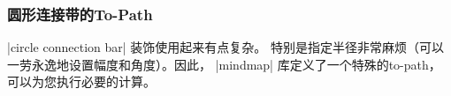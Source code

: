 \subsubsection{圆形连接带的To-Path}


|circle connection bar| 装饰使用起来有点复杂。 特别是指定半径非常麻烦（可以一劳永逸地设置幅度和角度）。因此， |mindmap| 库定义了一个特殊的to-path，可以为您执行必要的计算。

